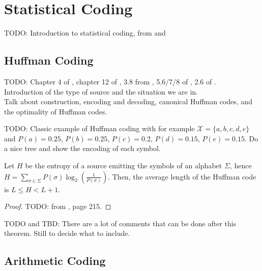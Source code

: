 \clearpage
\section{Statistical Coding}

TODO: Introduction to statistical coding, from \cite{han2002mathematics} and \cite{ferragina2023pearls}

\subsection{Huffman Coding}

TODO: Chapter 4 of \cite{sayood2002lossless}, chapter 12 of \cite{ferragina2023pearls}, 3.8 from \cite{han2002mathematics}, 5.6/7/8 of \cite{ElementsofInformationTheory}, 2.6 of \cite{navarro2016compact}. \\


\noindent Introduction of the type of source and the situation we are in.\\



Talk about construction, encoding and decoding, canonical Huffman codes, and the optimality of Huffman codes.

\begin{example}
    TODO: Classic example of Huffman coding with for example $\mathcal{X} = \{a,b,c,d,e\}$ and $P(a)= 0.25$, $P(b)=0.25$, $P(c)=0.2$, $P(d)=0.15$, $P(e)=0.15$. Do a nice tree and show the encoding of each symbol.
\end{example}

\begin{theorem}
    Let $H$ be the entropy of a source emitting the symbols of an alphabet $\Sigma$, hence $H = \sum_{\sigma \in \Sigma} P(\sigma)\log_2\left(\frac{1}{P(\sigma)}\right)$. Then, the average length of the Huffman code is $L \leq H < L + 1$.
\end{theorem}
\begin{proof}
    TODO: from \cite{ferragina2023pearls}, page 215.
\end{proof}
TODO and TBD: There are a lot of comments that can be done after this theorem. Still to decide what to include.

\subsection{Arithmetic Coding}
